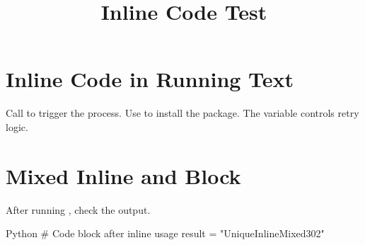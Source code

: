 \documentclass{SUSTechHomework}
\title{Inline Code Test}
\begin{document}
\maketitle

\section{Inline Code in Running Text}

Call  to trigger the process.
Use  to install the package.
The variable  controls retry logic.

\section{Mixed Inline and Block}

After running , check the output.

\begin{sustechcode}{Python}
# Code block after inline usage
result = "UniqueInlineMixed302"
\end{sustechcode}
\end{document}
